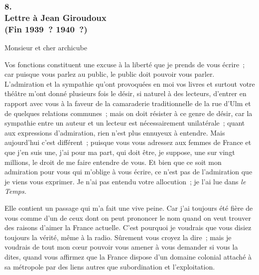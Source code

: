 \documentclass[french,twoside]{book} %
\begin{document}
\subsubsection[{8. Lettre à Jean Giroudoux, (Fin 1939 ? 1940 ?)}]{8. \\
Lettre à Jean Giroudoux \\
(Fin 1939 ? 1940 ?)}
\noindent \par
Monsieur et cher archicube\par
Vos fonctions constituent une excuse à la liberté que je prends de vous écrire ; car puisque vous parlez au public, le public doit pouvoir vous parler. L'admiration et la sympathie qu'ont provoquées en moi vos livres et surtout votre théâtre m'ont donné plusieurs fois le désir, si naturel à des lecteurs, d'entrer en rapport avec vous à la faveur de la camaraderie traditionnelle de la rue d'Ulm et de quelques relations communes ; mais on doit résister à ce genre de désir, car la sympathie entre un auteur et un lecteur est nécessairement unilatérale ; quant aux expressions d'admiration, rien n'est plus ennuyeux à entendre. Mais aujourd'hui c'est différent ; puisque vous vous adressez aux femmes de France et que j'en suis une, j'ai pour ma part, qui doit être, je suppose, une sur vingt millions, le droit de me faire entendre de vous. Et bien que ce soit mon admiration pour vous qui m'oblige à vous écrire, ce n'est pas de l'admiration que je viens vous exprimer. Je n'ai pas entendu votre allocu­tion ; je l'ai lue dans {\itshape le Temps.}\par
Elle contient un passage qui m'a fait une vive peine. Car j'ai toujours été fière de vous comme d'un de ceux dont on peut prononcer le nom quand on veut trouver des raisons d'aimer la France actuelle. C'est pourquoi je voudrais que vous disiez toujours la vérité, même à la radio. Sûrement vous croyez la dire ; mais je voudrais de tout mon cœur pouvoir vous amener à vous demander si vous la dites, quand vous affirmez que la France dispose d'un domaine colonial attaché à sa métropole par des liens autres que subordination et l'exploitation.\par
\end{document}
